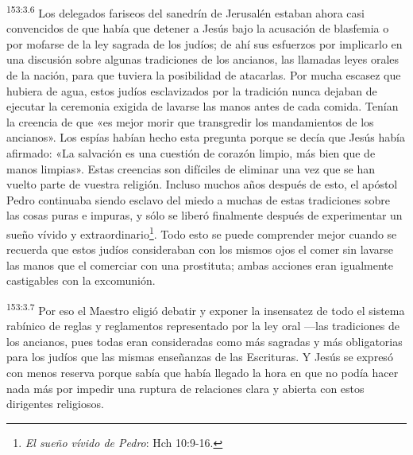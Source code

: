 \par 
\textsuperscript{153:3.6} Los delegados fariseos del sanedrín de Jerusalén estaban ahora casi convencidos de que había que detener a Jesús bajo la acusación de blasfemia o por mofarse de la ley sagrada de los judíos; de ahí sus esfuerzos por implicarlo en una discusión sobre algunas tradiciones de los ancianos, las llamadas leyes orales de la nación, para que tuviera la posibilidad de atacarlas. Por mucha escasez que hubiera de agua, estos judíos esclavizados por la tradición nunca dejaban de ejecutar la ceremonia exigida de lavarse las manos antes de cada comida. Tenían la creencia de que «es mejor morir que transgredir los mandamientos de los ancianos». Los espías habían hecho esta pregunta porque se decía que Jesús había afirmado: «La salvación es una cuestión de corazón limpio, más bien que de manos limpias». Estas creencias son difíciles de eliminar una vez que se han vuelto parte de vuestra religión. Incluso muchos años después de esto, el apóstol Pedro continuaba siendo esclavo del miedo a muchas de estas tradiciones sobre las cosas puras e impuras, y sólo se liberó finalmente después de experimentar un sueño vívido y extraordinario\footnote{\textit{El sueño vívido de Pedro}: Hch 10:9-16.}. Todo esto se puede comprender mejor cuando se recuerda que estos judíos consideraban con los mismos ojos el comer sin lavarse las manos que el comerciar con una prostituta; ambas acciones eran igualmente castigables con la excomunión.

\par 
\textsuperscript{153:3.7} Por eso el Maestro eligió debatir y exponer la insensatez de todo el sistema rabínico de reglas y reglamentos representado por la ley oral ---las tradiciones de los ancianos, pues todas eran consideradas como más sagradas y más obligatorias para los judíos que las mismas enseñanzas de las Escrituras. Y Jesús se expresó con menos reserva porque sabía que había llegado la hora en que no podía hacer nada más por impedir una ruptura de relaciones clara y abierta con estos dirigentes religiosos.

